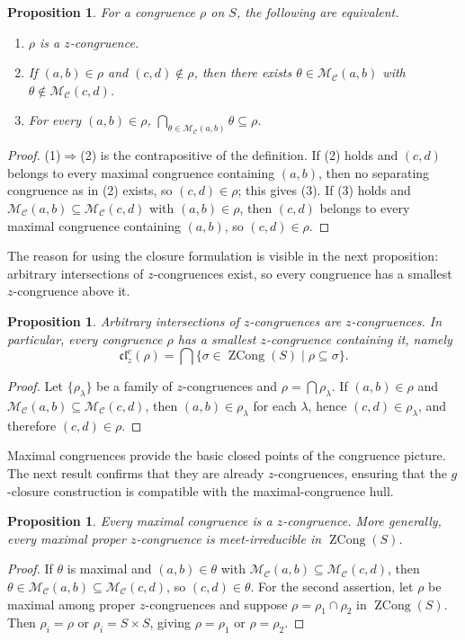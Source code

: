 \documentclass[11pt,leqno]{amsart}
\theoremstyle{plain}
\newtheorem{proposition}[theorem]{Proposition}
\theoremstyle{definition}
\theoremstyle{remark}
\numberwithin{equation}{section}
\DeclareMathOperator{\ZCong}{ZCong}
\newcommand{\MC}{\mathcal M_{\mathcal C}}
\newcommand{\clc}{\mathfrak{cl}^{c}_{z}}
\begin{document}
\begin{proposition}\label{prop:zcong-equivalences}
For a congruence $\rho$ on $S$, the following are equivalent.
\begin{enumerate}
\item $\rho$ is a $z$-congruence.
\item If $(a,b)\in\rho$ and $(c,d)\notin\rho$, then there exists
  $\theta\in\MC(a,b)$ with $\theta\notin\MC(c,d)$.
\item For every $(a,b)\in\rho$,
  $\displaystyle\bigcap_{\theta\in\MC(a,b)}\theta\subseteq\rho$.
\end{enumerate}
\end{proposition}
\begin{proof}
(1)$\Rightarrow$(2) is the contrapositive of the definition.
If (2) holds and $(c,d)$ belongs to every maximal congruence
containing $(a,b)$, then no separating congruence as in (2) exists,
so $(c,d)\in\rho$; this gives (3).
If (3) holds and $\MC(a,b)\subseteq\MC(c,d)$ with $(a,b)\in\rho$,
then $(c,d)$ belongs to every maximal congruence containing $(a,b)$,
so $(c,d)\in\rho$.
\end{proof}

The reason for using the closure formulation is visible in the next
proposition: arbitrary intersections of $z$-congruences exist,
so every congruence has a smallest $z$-congruence above it.

\begin{proposition}\label{prop:zcong-intersections}
Arbitrary intersections of $z$-congruences are $z$-congruences.
In particular, every congruence $\rho$ has a smallest
$z$-congruence containing it, namely
\[
\clc(\rho)=\bigcap\{\sigma\in\ZCong(S)\mid\rho\subseteq\sigma\}.
\]
\end{proposition}
\begin{proof}
Let $\{\rho_\lambda\}$ be a family of $z$-congruences and
$\rho=\bigcap\rho_\lambda$.
If $(a,b)\in\rho$ and $\MC(a,b)\subseteq\MC(c,d)$,
then $(a,b)\in\rho_\lambda$ for each $\lambda$,
hence $(c,d)\in\rho_\lambda$, and therefore $(c,d)\in\rho$.
\end{proof}

Maximal congruences provide the basic closed points of the
congruence picture.
The next result confirms that they are already $z$-congruences,
ensuring that the $g$-closure construction is compatible with the
maximal-congruence hull.

\begin{proposition}\label{prop:max-zcong}
Every maximal congruence is a $z$-congruence.  More generally,
every maximal proper $z$-congruence is meet-irreducible in
$\ZCong(S)$.
\end{proposition}
\begin{proof}
If $\theta$ is maximal and $(a,b)\in\theta$ with
$\MC(a,b)\subseteq\MC(c,d)$, then $\theta\in\MC(a,b)\subseteq\MC(c,d)$,
so $(c,d)\in\theta$.
For the second assertion, let $\rho$ be maximal among proper
$z$-congruences and suppose $\rho=\rho_1\cap\rho_2$ in $\ZCong(S)$.
Then $\rho_i=\rho$ or $\rho_i=S\times S$, giving
$\rho=\rho_1$ or $\rho=\rho_2$.
\end{proof}
\end{document}
